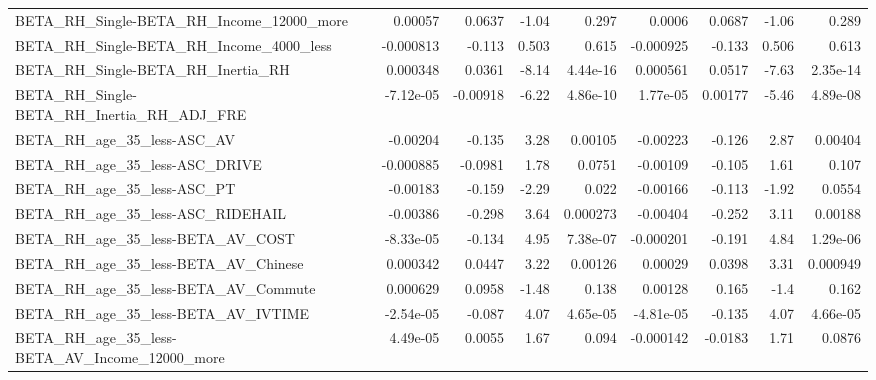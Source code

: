 \begin{tabular}{lrrrrrrrr}
BETA\_RH\_Single-BETA\_RH\_Income\_12000\_more           &     0.00057 &       0.0637 &    -1.04 &    0.297 &     0.0006 &      0.0687 &        -1.06 &         0.289 \\
BETA\_RH\_Single-BETA\_RH\_Income\_4000\_less            &   -0.000813 &       -0.113 &    0.503 &    0.615 &  -0.000925 &      -0.133 &        0.506 &         0.613 \\
BETA\_RH\_Single-BETA\_RH\_Inertia\_RH                  &    0.000348 &       0.0361 &    -8.14 & 4.44e-16 &   0.000561 &      0.0517 &        -7.63 &      2.35e-14 \\
BETA\_RH\_Single-BETA\_RH\_Inertia\_RH\_ADJ\_FRE          &   -7.12e-05 &     -0.00918 &    -6.22 & 4.86e-10 &   1.77e-05 &     0.00177 &        -5.46 &      4.89e-08 \\
BETA\_RH\_age\_35\_less-ASC\_AV                         &    -0.00204 &       -0.135 &     3.28 &  0.00105 &   -0.00223 &      -0.126 &         2.87 &       0.00404 \\
BETA\_RH\_age\_35\_less-ASC\_DRIVE                      &   -0.000885 &      -0.0981 &     1.78 &   0.0751 &   -0.00109 &      -0.105 &         1.61 &         0.107 \\
BETA\_RH\_age\_35\_less-ASC\_PT                         &    -0.00183 &       -0.159 &    -2.29 &    0.022 &   -0.00166 &      -0.113 &        -1.92 &        0.0554 \\
BETA\_RH\_age\_35\_less-ASC\_RIDEHAIL                   &    -0.00386 &       -0.298 &     3.64 & 0.000273 &   -0.00404 &      -0.252 &         3.11 &       0.00188 \\
BETA\_RH\_age\_35\_less-BETA\_AV\_COST                   &   -8.33e-05 &       -0.134 &     4.95 & 7.38e-07 &  -0.000201 &      -0.191 &         4.84 &      1.29e-06 \\
BETA\_RH\_age\_35\_less-BETA\_AV\_Chinese                &    0.000342 &       0.0447 &     3.22 &  0.00126 &    0.00029 &      0.0398 &         3.31 &      0.000949 \\
BETA\_RH\_age\_35\_less-BETA\_AV\_Commute                &    0.000629 &       0.0958 &    -1.48 &    0.138 &    0.00128 &       0.165 &         -1.4 &         0.162 \\
BETA\_RH\_age\_35\_less-BETA\_AV\_IVTIME                 &   -2.54e-05 &       -0.087 &     4.07 & 4.65e-05 &  -4.81e-05 &      -0.135 &         4.07 &      4.66e-05 \\
BETA\_RH\_age\_35\_less-BETA\_AV\_Income\_12000\_more      &    4.49e-05 &       0.0055 &     1.67 &    0.094 &  -0.000142 &     -0.0183 &         1.71 &        0.0876 \\

\end{tabular}
